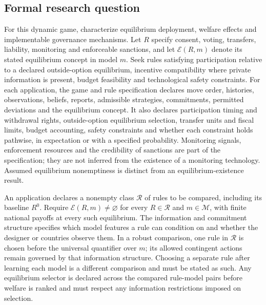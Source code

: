 \documentclass[11pt,a4paper]{article}
\begin{document}
\subsection*{Formal research question}

For this dynamic game, characterize equilibrium deployment, welfare effects and implementable governance mechanisms. Let $R$ specify consent, voting, transfers, liability, monitoring and enforceable sanctions, and let $\mathcal E(R,m)$ denote its stated equilibrium concept in model $m$. Seek rules satisfying participation relative to a declared outside-option equilibrium, incentive compatibility where private information is present, budget feasibility and technological safety constraints. For each application, the game and rule specification declares move order, histories, observations, beliefs, reports, admissible strategies, commitments, permitted deviations and the equilibrium concept. It also declares participation timing and withdrawal rights, outside-option equilibrium selection, transfer units and fiscal limits, budget accounting, safety constraints and whether each constraint holds pathwise, in expectation or with a specified probability. Monitoring signals, enforcement resources and the credibility of sanctions are part of the specification; they are not inferred from the existence of a monitoring technology. Assumed equilibrium nonemptiness is distinct from an equilibrium-existence result.

An application declares a nonempty class $\mathcal R$ of rules to be compared, including its baseline $R^0$. Require $\mathcal E(R,m)\ne\varnothing$ for every $R\in\mathcal R$ and $m\in\mathcal M$, with finite national payoffs at every such equilibrium. The information and commitment structure specifies which model features a rule can condition on and whether the designer or countries observe them. In a robust comparison, one rule in $\mathcal R$ is chosen before the universal quantifier over $m$; its allowed contingent actions remain governed by that information structure. Choosing a separate rule after learning each model is a different comparison and must be stated as such. Any equilibrium selector is declared across the compared rule-model pairs before welfare is ranked and must respect any information restrictions imposed on selection.
\end{document}

